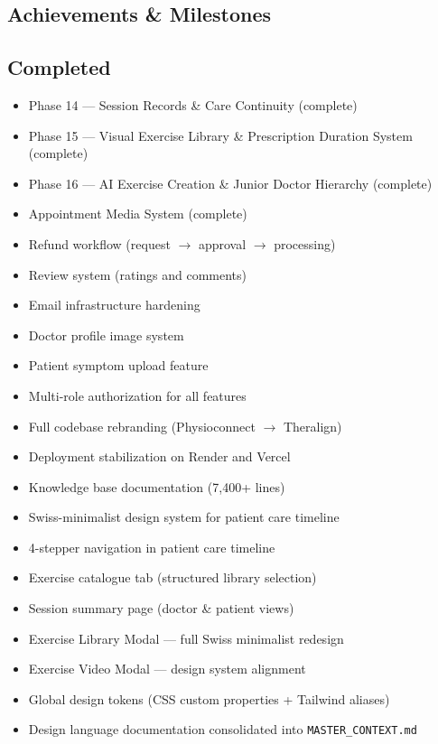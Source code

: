 \documentclass[11pt,a4paper]{article}
\begin{document}
\begin{itemize}
{\section{Achievements \& Milestones}

\subsection{Completed}

\begin{itemize}
  \item Phase 14 — Session Records \& Care Continuity (complete)
  \item Phase 15 — Visual Exercise Library \& Prescription Duration System (complete)
  \item Phase 16 — AI Exercise Creation \& Junior Doctor Hierarchy (complete)
  \item Appointment Media System (complete)
  \item Refund workflow (request $\rightarrow$ approval $\rightarrow$ processing)
  \item Review system (ratings and comments)
  \item Email infrastructure hardening
  \item Doctor profile image system
  \item Patient symptom upload feature
  \item Multi-role authorization for all features
  \item Full codebase rebranding (Physioconnect $\rightarrow$ Theralign)
  \item Deployment stabilization on Render and Vercel
  \item Knowledge base documentation (7,400+ lines)
  \item Swiss-minimalist design system for patient care timeline
  \item 4-stepper navigation in patient care timeline
  \item Exercise catalogue tab (structured library selection)
  \item Session summary page (doctor \& patient views)
  \item Exercise Library Modal — full Swiss minimalist redesign
  \item Exercise Video Modal — design system alignment
  \item Global design tokens (CSS custom properties + Tailwind aliases)
  \item Design language documentation consolidated into \texttt{MASTER\_CONTEXT.md}

\end{itemize}}
\end{itemize}
\end{document}
